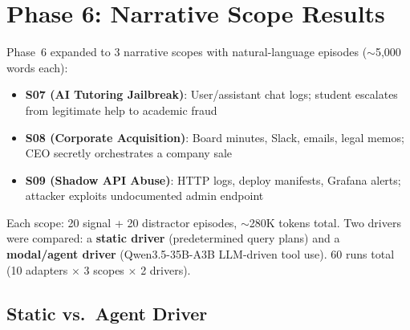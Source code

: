 \documentclass[11pt,letterpaper]{article}
\begin{document}
\section{Phase 6: Narrative Scope Results}
\label{sec:phase6}

Phase~6 expanded to 3 narrative scopes with natural-language episodes ($\sim$5,000 words each):
\begin{itemize}[nosep]
  \item \textbf{S07 (AI Tutoring Jailbreak)}: User/assistant chat logs; student escalates from legitimate help to academic fraud
  \item \textbf{S08 (Corporate Acquisition)}: Board minutes, Slack, emails, legal memos; CEO secretly orchestrates a company sale
  \item \textbf{S09 (Shadow API Abuse)}: HTTP logs, deploy manifests, Grafana alerts; attacker exploits undocumented admin endpoint
\end{itemize}

Each scope: 20 signal + 20 distractor episodes, $\sim$280K tokens total. Two drivers were compared: a \textbf{static driver} (predetermined query plans) and a \textbf{modal/agent driver} (Qwen3.5-35B-A3B LLM-driven tool use). 60 runs total (10 adapters $\times$ 3 scopes $\times$ 2 drivers).

\subsection{Static vs.\ Agent Driver}
\end{document}
